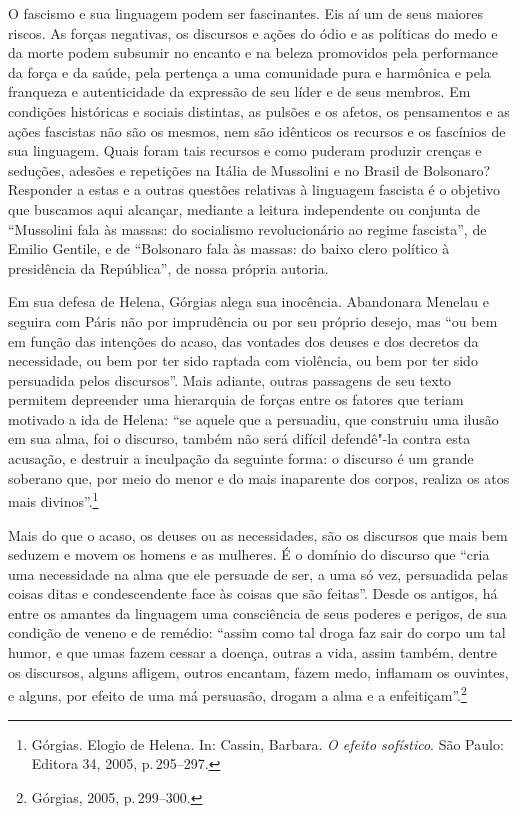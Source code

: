 O fascismo e sua linguagem podem ser fascinantes. Eis aí um de seus
maiores riscos. As forças negativas, os discursos e ações do ódio e as
políticas do medo e da morte podem subsumir no encanto e na beleza
promovidos pela performance da força e da saúde, pela pertença a uma
comunidade pura e harmônica e pela franqueza e autenticidade da
expressão de seu líder e de seus membros. Em condições históricas e
sociais distintas, as pulsões e os afetos, os pensamentos e as ações
fascistas não são os mesmos, nem são idênticos os recursos e os
fascínios de sua linguagem. Quais foram tais recursos e como puderam
produzir crenças e seduções, adesões e repetições na Itália de Mussolini
e no Brasil de Bolsonaro? Responder a estas e a outras questões
relativas à linguagem fascista é o objetivo que buscamos aqui alcançar,
mediante a leitura independente ou conjunta de ``Mussolini
fala às massas: do socialismo revolucionário ao regime fascista'', de
Emilio Gentile, e de ``Bolsonaro fala às massas: do baixo
clero político à presidência da República'', de nossa própria autoria.

\asterisc

Em sua defesa de Helena, Górgias alega sua inocência. Abandonara Menelau
e seguira com Páris não por imprudência ou por seu próprio desejo, mas
``ou bem em função das intenções do acaso, das vontades dos deuses e dos
decretos da necessidade, ou bem por ter sido raptada com violência, ou
bem por ter sido persuadida pelos discursos''. Mais adiante, outras
passagens de seu texto permitem depreender uma hierarquia de forças
entre os fatores que teriam motivado a ida de Helena: ``se aquele que a
persuadiu, que construiu uma ilusão em sua alma, foi o discurso, também
não será difícil defendê"-la contra esta acusação, e destruir a
inculpação da seguinte forma: o discurso é um grande soberano que, por
meio do menor e do mais inaparente dos corpos, realiza os atos mais
divinos''.\footnote{Górgias. Elogio de Helena. In: Cassin, Barbara.
  \emph{O efeito sofístico}. São Paulo: Editora 34, 2005, p.\,295--297.}


Mais do que o acaso, os deuses ou as necessidades, são os discursos que
mais bem seduzem e movem os homens e as mulheres. É o domínio do
discurso que ``cria uma necessidade na alma que ele persuade de ser, a
uma só vez, persuadida pelas coisas ditas e condescendente face às
coisas que são feitas''. Desde os antigos, há entre os amantes da
linguagem uma consciência de seus poderes e perigos, de sua condição de
veneno e de remédio: ``assim como tal droga faz sair do corpo um tal
humor, e que umas fazem cessar a doença, outras a vida, assim também,
dentre os discursos, alguns afligem, outros encantam, fazem medo,
inflamam os ouvintes, e alguns, por efeito de uma má persuasão, drogam a
alma e a enfeitiçam''.\footnote{Górgias, 2005, p.\,299--300.}

